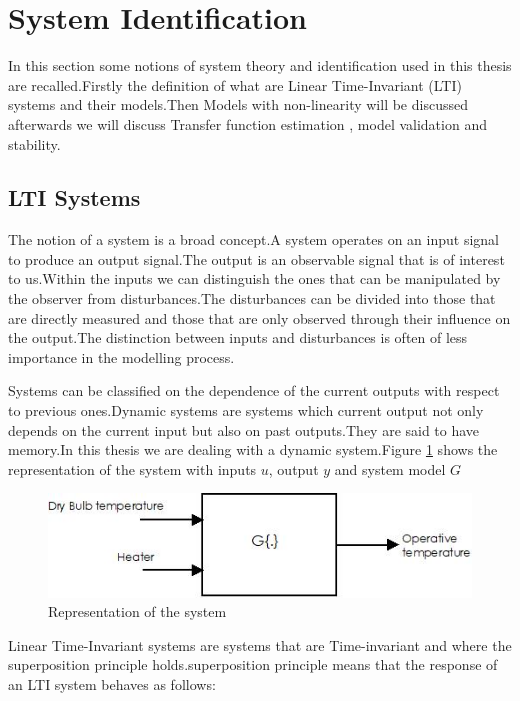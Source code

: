 \documentclass[a4paper,12pt]{article}
\numberwithin{equation}{section}
\begin{document}
\section{System Identification}
In this section some notions of system theory and identification used in this thesis are recalled.Firstly the definition of  what are Linear Time-Invariant (LTI) systems and their models.Then Models with non-linearity will be discussed afterwards we will discuss Transfer function estimation , model validation and stability. 

\subsection{LTI Systems}

The notion of a system is a broad concept.A system operates on an input signal to produce an output signal.The output is an observable signal that is of interest to us.Within the inputs we can distinguish the ones that can be manipulated by the observer from disturbances.The disturbances can be divided into those that are directly measured and those that are only observed through their influence on the output.The distinction between inputs and disturbances is often of less importance in the modelling process.

Systems can be classified on the dependence of the current outputs with respect to previous ones.Dynamic systems are systems which current output not only depends on the current input but also on past outputs.They are said to have memory.In this thesis we are dealing with a dynamic system.Figure \ref{fig:system representation} shows the representation of the system with inputs $u$, output $y$ and system model $G$

\begin{figure}[H]
    \includegraphics[scale=1]{system.jpeg}
    \centering
    \caption{Representation of the system}
    \label{fig:system representation}
\end{figure}


Linear Time-Invariant systems are systems that are Time-invariant and where the superposition principle holds.superposition principle means that the response of an LTI system behaves as follows:
    
\end{document}

